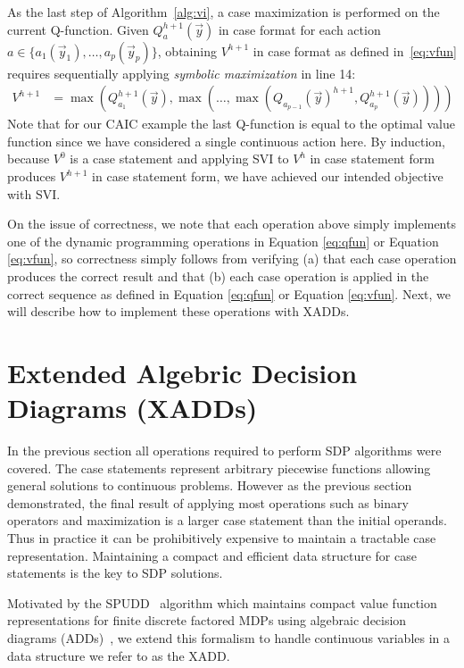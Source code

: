 \documentclass[twoside,11pt]{article}
\begin{document}
As the last step of Algorithm~\ref{alg:vi}, a case maximization is performed on the current Q-function. Given $Q_a^{h+1}(\vec{y})$ in
case format for each action $a \in\{a_{1}(\vec{y}_1), \ldots , a_{p}(\vec{y}_p)\}$, obtaining
$V^{h+1}$ in case format as defined in~\eqref{eq:vfun} requires
sequentially applying
\emph{symbolic maximization} in line 14:
\begin{align*}
V^{h+1} & = 
\max(Q_{a_1}^{h+1}(\vec{y}),\max(\ldots,\max(Q_{a_{p-1}}(\vec{y})^{h+1},Q_{a_p}^{h+1}(\vec{y}))))
\end{align*}
Note that for our \textsc{CAIC} example the last Q-function is equal to the optimal value function since we have considered a single continuous action here. %
By induction, because $V^0$ is a case statement and applying
SVI to $V^h$ in case statement form produces $V^{h+1}$ in case
statement form, we have achieved our intended
objective with SVI. 

On the issue of correctness,
we note that each operation above simply implements one of the
dynamic programming operations in Equation \eqref{eq:qfun} or Equation \eqref{eq:vfun}, 
so correctness simply follows from verifying (a) that each case
operation produces the correct result and that (b) each case operation
is applied in the correct sequence as defined in Equation \eqref{eq:qfun} or 
Equation \eqref{eq:vfun}. Next, we will describe how to implement these operations with XADDs.

\section{Extended Algebric Decision Diagrams (XADDs)} \label{XADD}

In the previous section all operations required to perform SDP algorithms were covered. The case statements represent arbitrary piecewise functions allowing general solutions to continuous problems. 
However as the previous section demonstrated, the final result of applying most operations such as binary operators and maximization is a larger case statement than the initial operands. Thus in practice it can be prohibitively expensive to maintain a tractable case representation. Maintaining a compact and efficient data structure for case statements is the key to SDP solutions.

Motivated by the SPUDD~\cite{spudd} algorithm which
maintains compact value function representations for finite discrete
factored MDPs using algebraic decision diagrams (ADDs)~\cite{bahar93add},
we extend this formalism to handle continuous variables in a data
structure we refer to as the XADD. 
\end{document}
